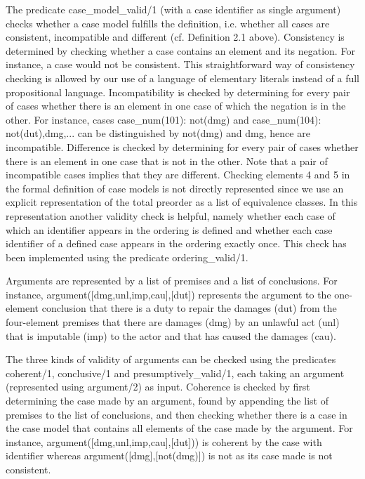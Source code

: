 \documentclass{IOS-Book-Article}
\begin{document}
The predicate {\mf case\_model\_valid/1} (with a case identifier as single argument) checks whether a case model fulfills the definition, i.e. whether all cases are consistent, incompatible and different (cf. Definition 2.1 above). Consistency is determined by checking whether a case contains an element and its negation. For instance, a case {} would not be consistent. This straightforward way of consistency checking is allowed by our use of a language of elementary literals instead of a full propositional language. Incompatibility is checked by determining for every pair of cases whether there is an element in one case of which the negation is in the other. For instance, cases 
{\mf case\_num(101): not(dmg)} and 
{\mf case\_num(104): not(dut),dmg,...} can be distinguished by {\mf not(dmg)} and {\mf dmg}, hence are incompatible. Difference is checked by determining for every pair of cases whether there is an element in one case that is not in the other. Note that a pair of incompatible cases implies that they are different. Checking elements 4 and 5 in the formal definition of case models is not directly represented since we use an explicit representation of the total preorder as a list of equivalence classes. In this representation another validity check is helpful, namely whether each case of which an identifier appears in the ordering is defined and whether each case identifier of a defined case appears in the ordering exactly once. This check has been implemented using the predicate {\mf ordering\_valid/1}.

Arguments are represented by a list of premises and a list of conclusions. For instance, {\mf argument([dmg,unl,imp,cau],[dut])} represents the argument to the one-element conclusion that there is a duty to repair the damages ({\mf dut}) from the four-element premises that there are damages ({\mf dmg}) by an unlawful act ({\mf unl}) that is imputable ({\mf imp}) to the actor and that has caused the damages ({\mf cau}).

The three kinds of validity of arguments can be checked using the predicates {\mf coherent/1}, {\mf conclusive/1} and {\mf presumptively\_valid/1}, each taking an argument (represented using {\mf argument/2}) as input. Coherence is checked by first determining the case made by an argument, found by appending the list of premises to the list of conclusions, and then checking whether there is a case in the case model that contains all elements of the case made by the argument. For instance, {\mf argument([dmg,unl,imp,cau],[dut]))} is coherent by the case with identifier {} whereas {\mf argument([dmg],[not(dmg)])} is not as its case made is not consistent.
\end{document}
